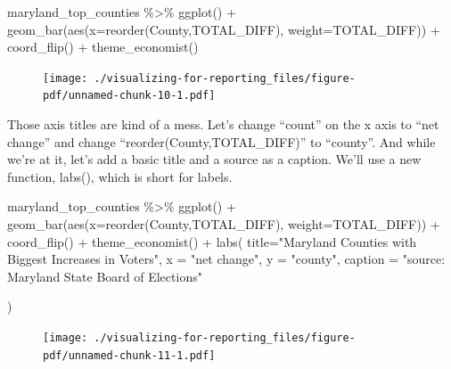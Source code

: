 \documentclass[
  letterpaper,
  DIV=11,
  numbers=noendperiod]{scrreprt}
\newenvironment{Shaded}{\begin{snugshade}}{\end{snugshade}}
\newcommand{\AttributeTok}[1]{\textcolor[rgb]{0.40,0.45,0.13}{#1}}
\newcommand{\FunctionTok}[1]{\textcolor[rgb]{0.28,0.35,0.67}{#1}}
\newcommand{\NormalTok}[1]{\textcolor[rgb]{0.00,0.23,0.31}{#1}}
\newcommand{\SpecialCharTok}[1]{\textcolor[rgb]{0.37,0.37,0.37}{#1}}
\newcommand{\StringTok}[1]{\textcolor[rgb]{0.13,0.47,0.30}{#1}}
\begin{document}
\begin{Shaded}
\begin{Highlighting}[]
\NormalTok{maryland\_top\_counties }\SpecialCharTok{\%\textgreater{}\%}
  \FunctionTok{ggplot}\NormalTok{() }\SpecialCharTok{+}
  \FunctionTok{geom\_bar}\NormalTok{(}\FunctionTok{aes}\NormalTok{(}\AttributeTok{x=}\FunctionTok{reorder}\NormalTok{(County,TOTAL\_DIFF), }\AttributeTok{weight=}\NormalTok{TOTAL\_DIFF)) }\SpecialCharTok{+}
  \FunctionTok{coord\_flip}\NormalTok{() }\SpecialCharTok{+} 
  \FunctionTok{theme\_economist}\NormalTok{()}
\end{Highlighting}
\end{Shaded}

\begin{figure}[H]

{\centering \texttt{[image: ./visualizing-for-reporting\_files/figure-pdf/unnamed-chunk-10-1.pdf]}

}

\end{figure}

Those axis titles are kind of a mess. Let's change ``count'' on the x
axis to ``net change'' and change ``reorder(County,TOTAL\_DIFF)'' to
``county''. And while we're at it, let's add a basic title and a source
as a caption. We'll use a new function, labs(), which is short for
labels.

\begin{Shaded}
\begin{Highlighting}[]
\NormalTok{maryland\_top\_counties }\SpecialCharTok{\%\textgreater{}\%}
  \FunctionTok{ggplot}\NormalTok{() }\SpecialCharTok{+}
  \FunctionTok{geom\_bar}\NormalTok{(}\FunctionTok{aes}\NormalTok{(}\AttributeTok{x=}\FunctionTok{reorder}\NormalTok{(County,TOTAL\_DIFF), }\AttributeTok{weight=}\NormalTok{TOTAL\_DIFF)) }\SpecialCharTok{+}
  \FunctionTok{coord\_flip}\NormalTok{() }\SpecialCharTok{+} 
  \FunctionTok{theme\_economist}\NormalTok{() }\SpecialCharTok{+}
  \FunctionTok{labs}\NormalTok{(}
    \AttributeTok{title=}\StringTok{"Maryland Counties with Biggest Increases in Voters"}\NormalTok{,}
    \AttributeTok{x =} \StringTok{"net change"}\NormalTok{,}
    \AttributeTok{y =} \StringTok{"county"}\NormalTok{,}
    \AttributeTok{caption =} \StringTok{"source: Maryland State Board of Elections"}
    
\NormalTok{  )}
\end{Highlighting}
\end{Shaded}

\begin{figure}[H]

{\centering \texttt{[image: ./visualizing-for-reporting\_files/figure-pdf/unnamed-chunk-11-1.pdf]}

}

\end{figure}
\end{document}
